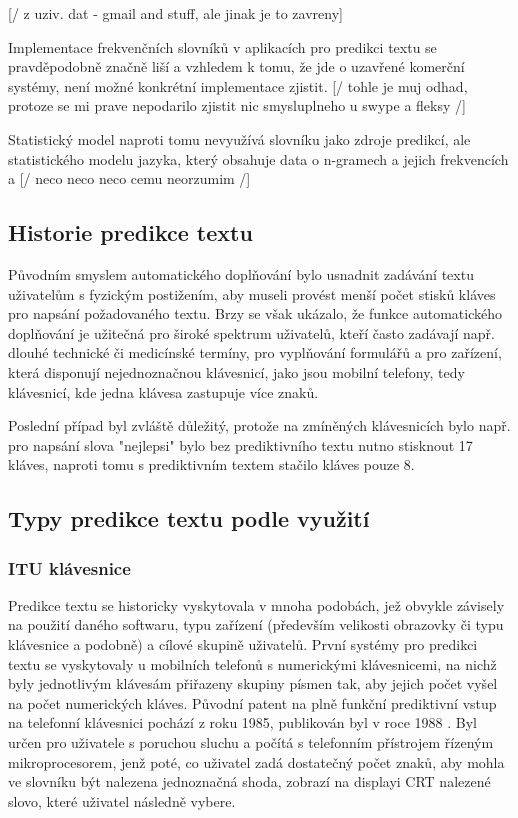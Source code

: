 \documentclass{article}
\begin{document}
[/ z uziv. dat - gmail and stuff, ale jinak je to zavreny]

Implementace frekvenčních slovníků v aplikacích pro predikci textu se pravděpodobně značně liší a vzhledem k tomu, že jde o uzavřené komerční systémy, není možné konkrétní implementace zjistit. [/ tohle je muj odhad, protoze se mi prave nepodarilo zjistit nic smysluplneho u swype a fleksy /] 

Statistický model naproti tomu nevyužívá slovníku jako zdroje predikcí, ale statistického modelu jazyka, který obsahuje data o n-gramech a jejich frekvencích a [/ neco neco neco cemu neorzumim /]


\subsection{Historie predikce textu}

Původním smyslem automatického doplňování bylo usnadnit zadávání textu uživatelům s fyzickým postižením, aby museli provést menší počet stisků kláves pro napsání požadovaného textu. Brzy se však ukázalo, že funkce automatického doplňování je užitečná pro široké spektrum uživatelů, kteří často zadávají např. dlouhé technické či medicínské termíny, pro vyplňování formulářů a pro zařízení, která disponují nejednoznačnou klávesnicí, jako jsou mobilní telefony, tedy klávesnicí, kde jedna klávesa zastupuje více znaků. 

Poslední případ byl zvláště důležitý, protože na zmíněných klávesnicích bylo např. pro napsání slova "nejlepsi" bylo bez prediktivního textu nutno stisknout 17 kláves, naproti tomu s prediktivním textem stačilo kláves pouze 8. \cite{dXVv6nPb2KifFXYv}

\subsection{Typy predikce textu podle využití}

\subsubsection{ITU klávesnice}

Predikce textu se historicky vyskytovala v mnoha podobách, jež obvykle závisely na použití daného softwaru, typu zařízení (především velikosti obrazovky či typu klávesnice a podobně) a cílové skupině uživatelů. První systémy pro predikci textu se vyskytovaly u mobilních telefonů s numerickými klávesnicemi, na nichž byly jednotlivým klávesám přiřazeny skupiny písmen tak, aby jejich počet vyšel na počet numerických kláves. Původní patent na plně funkční prediktivní vstup na telefonní klávesnici pochází z roku 1985, publikován byl v roce 1988 \cite{Feinson1988}. Byl určen pro uživatele s poruchou sluchu a počítá s telefonním přístrojem řízeným mikroprocesorem, jenž poté, co uživatel zadá dostatečný počet znaků, aby mohla ve slovníku být nalezena jednoznačná shoda, zobrazí na displayi CRT nalezené slovo, které uživatel následně vybere.
\end{document}
